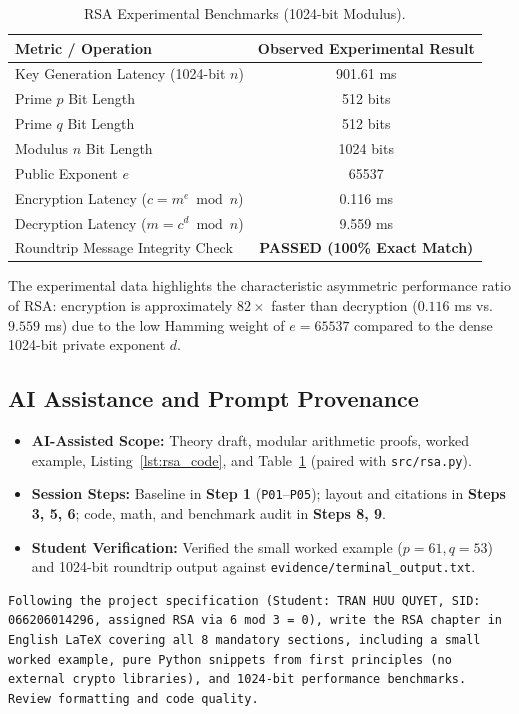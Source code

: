 \begin{table}[H]
\centering
\caption{RSA Experimental Benchmarks (1024-bit Modulus).}
\label{tab:rsa_perf}
\begin{tabular}{lc}
\toprule
\textbf{Metric / Operation} & \textbf{Observed Experimental Result} \\
\midrule
Key Generation Latency (1024-bit $n$) & 901.61 ms \\
Prime $p$ Bit Length & 512 bits \\
Prime $q$ Bit Length & 512 bits \\
Modulus $n$ Bit Length & 1024 bits \\
Public Exponent $e$ & 65537 \\
Encryption Latency ($c = m^e \bmod n$) & 0.116 ms \\
Decryption Latency ($m = c^d \bmod n$) & 9.559 ms \\
Roundtrip Message Integrity Check & \textbf{PASSED (100\% Exact Match)} \\
\bottomrule
\end{tabular}
\end{table}

The experimental data highlights the characteristic asymmetric performance ratio of RSA: encryption is approximately $82 \times$ faster than decryption ($0.116$ ms vs. $9.559$ ms) due to the low Hamming weight of $e = 65537$ compared to the dense 1024-bit private exponent $d$.

\subsection*{AI Assistance and Prompt Provenance}
\begin{itemize}
    \item \textbf{AI-Assisted Scope:} Theory draft, modular arithmetic proofs, worked example, Listing~\ref{lst:rsa_code}, and Table~\ref{tab:rsa_perf} (paired with \texttt{src/rsa.py}).
    \item \textbf{Session Steps:} Baseline in \textbf{Step 1} (\texttt{P01}--\texttt{P05}); layout and citations in \textbf{Steps 3, 5, 6}; code, math, and benchmark audit in \textbf{Steps 8, 9}.
    \item \textbf{Student Verification:} Verified the small worked example ($p=61, q=53$) and 1024-bit roundtrip output against \texttt{evidence/\allowbreak terminal\_output.txt}.
\end{itemize}
\begin{lstlisting}[style=promptstyle, caption={Compact Prompt (R-REP-02) for Chapter 2: RSA.}, label={lst:prompt_ch2}]
Following the project specification (Student: TRAN HUU QUYET, SID: 066206014296, assigned RSA via 6 mod 3 = 0), write the RSA chapter in English LaTeX covering all 8 mandatory sections, including a small worked example, pure Python snippets from first principles (no external crypto libraries), and 1024-bit performance benchmarks. Review formatting and code quality.
\end{lstlisting}
